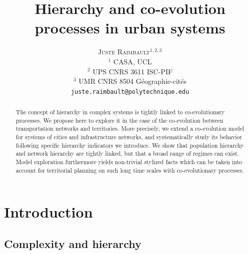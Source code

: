 \documentclass[11pt]{article}
\newcommand{\noun}[1]{\textsc{#1}}
\begin{document}
\title{Hierarchy and co-evolution processes in urban systems}
\author{\noun{Juste Raimbault}$^{1,2,3}$\\
$^1$ CASA, UCL\\
$^2$ UPS CNRS 3611 ISC-PIF\\
$^3$ UMR CNRS 8504 G{\'e}ographie-cit{\'e}s\\
\texttt{juste.raimbault@polytechnique.edu}
}
\date{}

\maketitle

\justify


\begin{abstract}
The concept of hierarchy in complex systems is tightly linked to co-evolutionary processes. We propose here to explore it in the case of the co-evolution between transportation networks and territories. More precisely, we extend a co-evolution model for systems of cities and infrastructure networks, and systematically study its behavior following specific hierarchy indicators we introduce. We show that population hierarchy and network hierarchy are tightly linked, but that a broad range of regimes can exist. Model exploration furthermore yields non-trivial stylized facts which can be taken into account for territorial planning on such long time scales with co-evolutionary processes.
\end{abstract}





\section{Introduction}


\subsection{Complexity and hierarchy}
\end{document}
